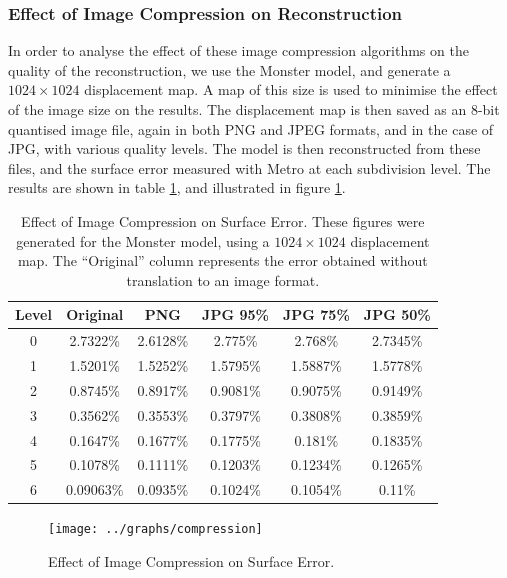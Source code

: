 \subsubsection{\label{sec:dispmapanim:compression:results:reconstr}Effect of Image Compression on Reconstruction}

In order to analyse the effect of these image compression algorithms on the quality of the reconstruction, we use the Monster model, and generate a $1024\times1024$ displacement map. A map of this size is used to minimise the effect of the image size on the results. The displacement map is then saved as an 8-bit quantised image file, again in both PNG and JPEG formats, and in the case of JPG, with various quality levels. The model is then reconstructed from these files, and the surface error measured with Metro at each subdivision level. The results are shown in table \ref{tbl:compression}, and illustrated in figure \ref{fig:compression}.

\begin{table}
\begin{center}
\begin{tabular}{c||c|cccc}
Level & Original & PNG & JPG 95\% & JPG 75\% & JPG 50\% \\
\hline
0 & 2.7322\% & 2.6128\% & 2.775\% & 2.768\% & 2.7345\% \\
1 & 1.5201\% & 1.5252\% & 1.5795\% & 1.5887\% & 1.5778\% \\
2 & 0.8745\% & 0.8917\% & 0.9081\% & 0.9075\% & 0.9149\% \\
3 & 0.3562\% & 0.3553\% & 0.3797\% & 0.3808\% & 0.3859\% \\
4 & 0.1647\% & 0.1677\% & 0.1775\% & 0.181\% & 0.1835\% \\
5 & 0.1078\% & 0.1111\% & 0.1203\% & 0.1234\% & 0.1265\% \\
6 & 0.09063\% & 0.0935\% & 0.1024\% & 0.1054\% & 0.11\%
\end{tabular}
\caption[Effect of Image Compression on Surface Error]{\label{tbl:compression} Effect of Image Compression on Surface Error. These figures were generated for the Monster model, using a $1024\times1024$ displacement map. The ``Original'' column represents the error obtained without translation to an image format.}
\end{center}
\end{table}

\begin{figure}
\begin{center}
\texttt{[image: ../graphs/compression]}
\caption[Effect of Image Compression on Surface Error]{\label{fig:compression} Effect of Image Compression on Surface Error. }
\end{center}
\end{figure}

